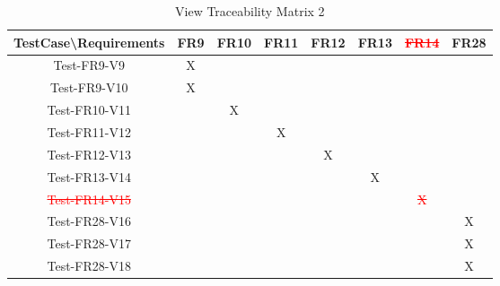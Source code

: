 \documentclass[12pt, titlepage]{article}
\begin{document}
\begin{table}[htp]
\centering
\caption{View Traceability Matrix 2}
\begin{tabular}{|c|c|c|c|c|c|c|c|}
\hline
TestCase\textbackslash{}Requirements & FR9 & FR10 & FR11 & FR12 & FR13 & \textcolor{red}{\st{FR14}}   & FR28 \\ \hline
Test-FR9-V9                          & X   &      &      &      &      &      &      \\ \hline
Test-FR9-V10                         & X   &      &      &      &      &      &      \\ \hline
Test-FR10-V11                        &     & X    &      &      &      &      &      \\ \hline
Test-FR11-V12                        &     &      & X    &      &      &      &      \\ \hline
Test-FR12-V13                        &     &      &      & X    &      &      &      \\ \hline
Test-FR13-V14                        &     &      &      &      & X    &      &      \\ \hline
\textcolor{red}{\st{Test-FR14-V15}}                        &     &      &      &      &      & \textcolor{red}{\st{X}}     &      \\ \hline
Test-FR28-V16                        &     &      &      &      &      &      & X    \\ \hline
Test-FR28-V17                        &     &      &      &      &      &      & X    \\ \hline
Test-FR28-V18                        &     &      &      &      &      &      & X    \\ \hline
\end{tabular}
\end{table}
\newpage
\end{document}
